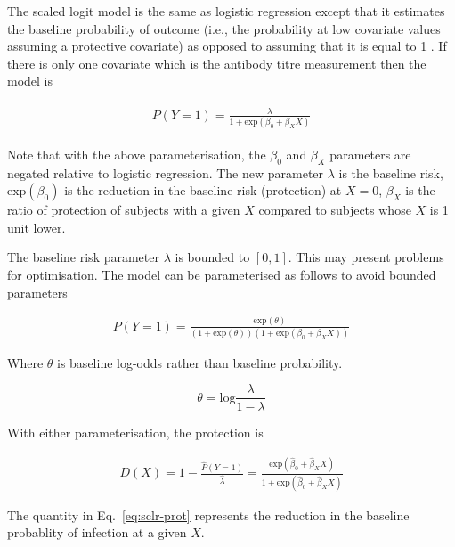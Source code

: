The scaled logit model is the same as logistic regression except that it estimates the baseline probability of outcome (i.e., the probability at low covariate values assuming a protective covariate) as opposed to assuming that it is equal to 1 \cite{Dunning;2006}. If there is only one covariate which is the antibody titre measurement then the model is

\begin{align*}
    \begin{gathered}
        P(Y=1) = \frac{\lambda}{1 + \text{exp}(\beta_0 + \beta_X X)}
    \end{gathered}
\end{align*}

Note that with the above parameterisation, the $\beta_0$ and $\beta_X$ parameters are negated relative to logistic regression. The new parameter $\lambda$ is the baseline risk, $\text{exp}(\beta_0)$ is the reduction in the baseline risk (protection) at $X=0$, $\beta_X$ is the ratio of protection of subjects with a given $X$ compared to subjects whose $X$ is 1 unit lower.

The baseline risk parameter $\lambda$ is bounded to $[0, 1]$. This may present problems for optimisation. The model can be parameterised as follows to avoid bounded parameters

\begin{gather*}
    P(Y=1) = \frac{\text{exp}(\theta)}{(1 + \text{exp}(\theta))(1 + \text{exp}(\beta_0 + \beta_X X))}
\end{gather*}

Where $\theta$ is baseline log-odds rather than baseline probability.

$$
    \theta = \text{log}\frac{\lambda}{1 - \lambda}
$$

With either parameterisation, the protection is

\begin{gather}
    D(X) = 1 - \frac{\hat{P}(Y=1)}{\hat{\lambda}} = \frac{\text{exp}(\hat{\beta}_0 + \hat{\beta}_X X)}{1 + \text{exp}(\hat{\beta}_0 + \hat{\beta}_X X)}
    \label{eq:sclr-prot}
\end{gather}

The quantity in Eq.~\ref{eq:sclr-prot} represents the reduction in the baseline probablity of infection at a given $X$.

